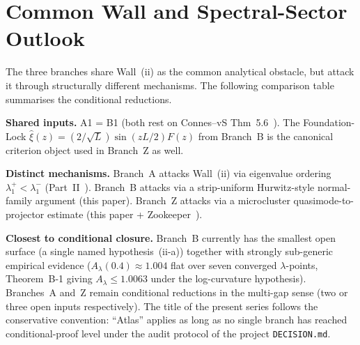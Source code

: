 \documentclass[12pt,a4paper]{article}
\theoremstyle{definition}
\theoremstyle{remark}
\begin{document}
\section{Common Wall and Spectral-Sector Outlook}
\label{sec:common-wall}

The three branches share Wall~(ii) as the common analytical obstacle, but
attack it through structurally different mechanisms. The following
comparison table summarises the conditional reductions.

\begin{center}
\renewcommand{\arraystretch}{1.3}
\end{center}

\noindent\textbf{Shared inputs.} A1 = B1 (both rest on Connes--vS
Thm~5.6~\cite{ConnesvS2025}). The Foundation-Lock
$\hat\xi(z) = (2/\sqrt L)\sin(zL/2)F(z)$ from Branch~B is the
canonical criterion object used in Branch~Z as well.

\noindent\textbf{Distinct mechanisms.} Branch~A attacks Wall~(ii)
via eigenvalue ordering $\lambda_1^+ < \lambda_1^-$
(Part~II~\cite{Geiger2026partII}). Branch~B attacks via a
strip-uniform Hurwitz-style normal-family argument (this paper).
Branch~Z attacks via a microcluster quasimode-to-projector estimate
(this paper + Zookeeper~\cite{Geiger2026zookeeper}).

\noindent\textbf{Closest to conditional closure.} Branch~B currently has
the smallest open surface (a single named hypothesis~(ii-a)) together
with strongly sub-generic empirical evidence
($A_\lambda(0.4)\approx 1.004$ flat over seven converged
$\lambda$-points, Theorem~B-1 giving $A_\lambda \leq 1.0063$ under the
log-curvature hypothesis). Branches~A and~Z remain conditional
reductions in the multi-gap sense (two or three open inputs
respectively). The title of the present series follows the conservative
convention: ``Atlas'' applies as long as no single branch has reached
conditional-proof level under the audit protocol of the project
\texttt{DECISION.md}.
\end{document}
